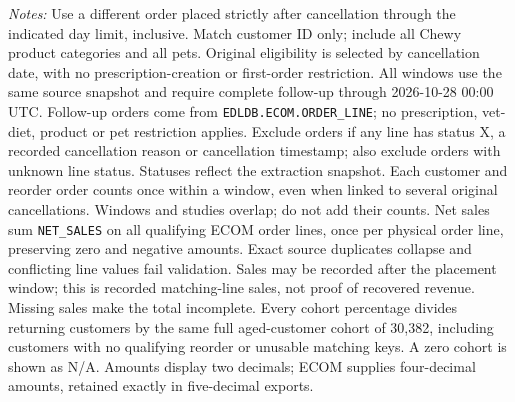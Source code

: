 \begin{table}[!htbp]
\begin{minipage}{\linewidth}
\footnotesize
\textit{Notes:} Use a different order placed strictly after cancellation through the indicated day limit, inclusive. Match customer ID only; include all Chewy product categories and all pets. Original eligibility is selected by
cancellation date, with no prescription-creation or first-order restriction.
All windows use the same source snapshot and require complete follow-up through
2026-10-28 00:00 UTC. Follow-up orders come from \texttt{EDLDB.ECOM.ORDER\_LINE}; no prescription, vet-diet, product or pet restriction applies. Exclude orders if any line has
status X, a recorded cancellation reason or cancellation timestamp; also exclude
orders with unknown line status. Statuses reflect the extraction snapshot.
Each customer and reorder order counts once within a window, even when linked
to several original cancellations. Windows and studies overlap; do not add their counts.
Net sales sum \texttt{NET\_SALES} on all qualifying ECOM order lines,
once per physical order line, preserving zero and negative amounts. Exact source duplicates collapse and conflicting line values fail validation.
Sales may be recorded after the placement window; this is recorded matching-line
sales, not proof of recovered revenue. Missing sales make the total incomplete.
Every cohort percentage divides returning customers by the same full aged-customer cohort of 30,382, including customers with no qualifying reorder or unusable matching keys. A zero cohort is shown as N/A. Amounts display two decimals; ECOM supplies four-decimal amounts, retained exactly in five-decimal exports.
\end{minipage}
\end{table}
